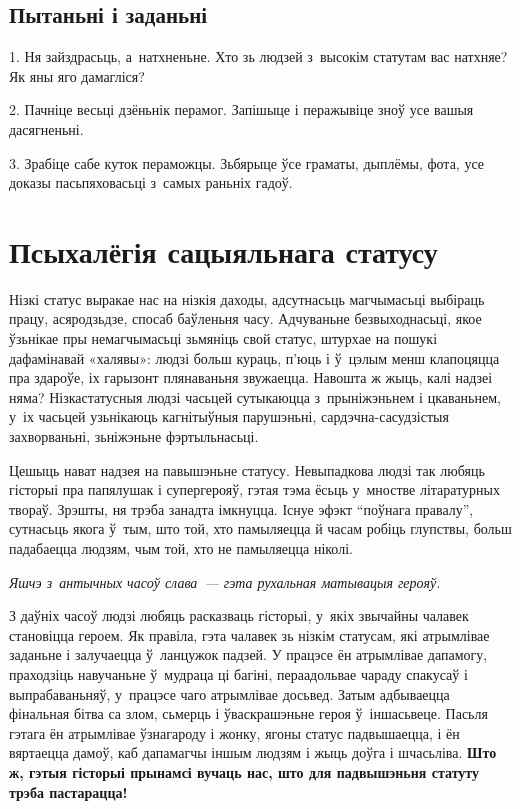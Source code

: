 \subsection*{Пытаньні і заданьні}

1. Ня зайздрасьць, а~натхненьне. Хто зь людзей з~высокім статутам вас натхняе? Як яны яго дамагліся?

2. Пачніце весьці дзёньнік перамог. Запішыце і перажывіце зноў усе вашыя дасягненьні.

3. Зрабіце сабе куток пераможцы. Зьбярыце ўсе граматы, дыплёмы, фота, усе доказы пасьпяховасьці з~самых раньніх гадоў.


\section{Псыхалёгія сацыяльнага статусу}

Нізкі статус выракае нас на нізкія даходы, адсутнасьць магчымасьці выбіраць працу, асяродзьдзе, спосаб баўленьня часу. Адчуваньне безвыходнасьці, якое ўзьнікае пры немагчымасьці зьмяніць свой статус, штурхае на пошукі дафамінавай «халявы»: людзі больш кураць, п'юць і ў~цэлым менш клапоцяцца пра здароўе, іх гарызонт плянаваньня звужаецца. Навошта ж жыць, калі надзеі няма? Нізкастатусныя людзі часьцей сутыкаюцца з~прыніжэньнем і цкаваньнем, у~іх часьцей узьнікаюць кагнітыўныя парушэньні, сардэчна-сасудзістыя захворваньні, зьніжэньне фэртыльнасьці.


Цешыць нават надзея на павышэньне статусу. Невыпадкова людзі так любяць гісторыі пра папялушак і супергерояў, гэтая тэма ёсьць у~мностве літаратурных твораў. Зрэшты, ня трэба занадта імкнуцца. Існуе эфэкт ``поўнага правалу'', сутнасьць якога ў~тым, што той, хто памыляецца й часам робіць глупствы, больш падабаецца людзям, чым той, хто не памыляецца ніколі.

\emph{Яшчэ з~антычных часоў слава~--- гэта рухальная матывацыя герояў.}

З даўніх часоў людзі любяць расказваць гісторыі, у~якіх звычайны чалавек становіцца героем. Як правіла, гэта чалавек зь нізкім статусам, які атрымлівае заданьне і залучаецца ў~ланцужок падзей. У працэсе ён атрымлівае дапамогу, праходзіць навучаньне ў~мудраца ці багіні, пераадольвае чараду спакусаў і выпрабаваньняў, у~працэсе чаго атрымлівае досьвед. Затым адбываецца фінальная бітва са злом, сьмерць і ўваскрашэньне героя ў~іншасьвеце. Пасьля гэтага ён атрымлівае ўзнагароду і жонку, ягоны статус падвышаецца, і ён вяртаецца дамоў, каб дапамагчы іншым людзям і жыць доўга і шчасьліва. \textbf{Што ж, гэтыя гісторыі прынамсі вучаць нас, што для падвышэньня статуту трэба пастарацца!}

